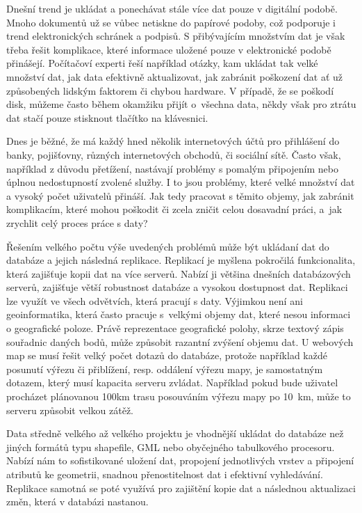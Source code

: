 Dnešní trend je ukládat a ponechávat stále více dat pouze v digitální podobě. Mnoho dokumentů už se vůbec netiskne do papírové podoby, což podporuje i trend e\-le\-ktro\-nic\-kých schránek a podpisů. S přibývajícím množstvím dat je však třeba řešit komplikace, které informace uložené pouze v elektronické podobě přinášejí. Počítačoví experti řeší například otázky, kam ukládat tak velké množství dat, jak data efektivně aktualizovat, jak zabránit poškození dat ať už způsobených lidským faktorem či chybou hardware. V případě, že se poškodí disk, můžeme často během okamžiku přijít o~všechna data, někdy však pro ztrátu dat stačí pouze stisknout tlačítko na klávesnici.

Dnes je běžné, že má každý hned několik internetových účtů pro přihlášení do banky, pojišťovny, různých internetových obchodů, či sociální sítě. Často však, například z důvodu přetížení, nastávají problémy s pomalým připojením nebo úplnou nedostupností zvolené služby. I to jsou problémy, které velké množství dat a vysoký počet uživatelů přináší. Jak tedy pracovat s těmito objemy, jak zabránit komplikacím, které mohou poškodit či zcela zničit celou dosavadní práci, a~jak zrychlit celý proces práce s daty? 

Řešením velkého počtu výše uvedených problémů může být ukládaní dat do databáze a jejich následná replikace. Replikací je myšlena pokročilá funkcionalita, která zajišťuje kopii dat na více serverů. Nabízí ji většina dnešních databázových serverů, zajišťuje větší robustnost databáze a vysokou dostupnost dat. Replikaci lze využít ve všech odvětvích, která pracují s daty. Výjimkou není ani geoinformatika, která často pracuje s~velkými objemy dat, které nesou informaci o geografické poloze. Právě reprezentace geografické polohy, skrze textový zápis souřadnic daných bodů, může způsobit razantní zvýšení objemu dat. U webových map se musí řešit velký počet dotazů do databáze, protože například každé posunutí výřezu či přiblížení, resp. oddálení výřezu mapy, je samostatným dotazem, který musí kapacita serveru zvládat. Například pokud bude uživatel procházet plánovanou 100km trasu posouváním výřezu mapy po 10~km, může to serveru způsobit velkou zátěž.

Data středně velkého až velkého projektu je vhodnější ukládat do databáze než jiných formátů typu shapefile, GML nebo obyčejného tabulkového procesoru. Nabízí nám to sofistikované uložení dat, propojení jednotlivých vrstev a připojení atributů ke geometrii, snadnou přenostitelnost dat i efektivní vyhledávání. Replikace samotná se poté využívá pro zajištění kopie dat a následnou aktualizaci změn, která v databázi nastanou. 

